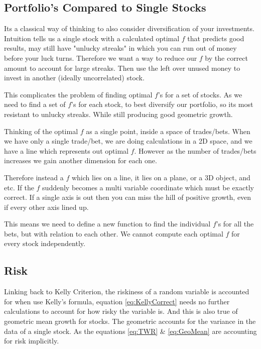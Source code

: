 \documentclass[12pt]{article}
\begin{document}
\subsection{Portfolio's Compared to Single Stocks}

    Its a classical way of thinking to also consider diversification
    of your investments. Intuition tells us a single stock with a calculated optimal \(f\) that predicts
    good results, may still have "unlucky streaks" in which you can run out of money before
    your luck turns. Therefore we want a way to reduce our \(f\) by the correct amount
    to account for large streaks. Then use the left over unused money to invest in
    another (ideally uncorrelated) stock.

    This complicates the problem of finding optimal \(f\)'s for a set of stocks. As we
    need to find a set of \(f\)'s for each stock, to best diversify our portfolio, so
    its most resistant to unlucky streaks. While still producing good geometric growth.

    Thinking of the optimal \(f\) as a single point, inside a space of trades/bets. When we have 
    only a single trade/bet, we are doing calculations in a 2D space, and we have a line which 
    represents out optimal \(f\). However as the number of trades/bets increases we gain
    another dimension for each one.

    Therefore instead a \(f\) which lies on a line, it lies on a plane, or a 3D object, 
    and etc. If the \(f\) suddenly becomes a multi variable coordinate which must be 
    exactly correct. If a single axis is out then you can miss the hill of positive 
    growth, even if every other axis lined up.

    This means we need to define a new function to find the individual \(f\)'s for all the bets,
    but with relation to each other. We cannot compute each optimal \(f\) for every stock
    independently.


\subsection{Risk}

    Linking back to Kelly Criterion, the riskiness of a random variable is accounted for
    when use Kelly's formula, equation \ref{eq:KellyCorrect} needs no further calculations
    to account for how risky the variable is. And this is also true of geometric mean growth
    for stocks. The geometric accounts for the variance in the data of a single stock. As the
    equations \ref{eq:TWR} \& \ref{eq:GeoMean} are accounting for risk implicitly.
\end{document}
